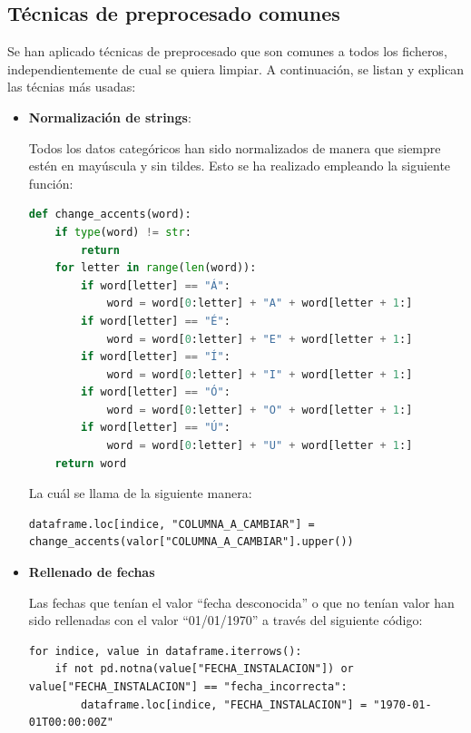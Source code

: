 \documentclass[]{article}
\begin{document}
\subsection{Técnicas de preprocesado comunes}
\label{subsec:preprocesadocomun}
Se han aplicado técnicas de preprocesado que son comunes a todos los ficheros, independientemente de cual se quiera limpiar. A continuación, se listan y explican las técnias más usadas:

\begin{itemize}
    \item \textbf{Normalización de strings}:

    Todos los datos categóricos han sido normalizados de manera que siempre estén en mayúscula y sin tildes. Esto se ha realizado empleando la siguiente función:

    \begin{lstlisting}[language=Python,caption=Eliminación de tildes]
def change_accents(word):
    if type(word) != str:
        return
    for letter in range(len(word)):
        if word[letter] == "Á":
            word = word[0:letter] + "A" + word[letter + 1:]
        if word[letter] == "É":
            word = word[0:letter] + "E" + word[letter + 1:]
        if word[letter] == "Í":
            word = word[0:letter] + "I" + word[letter + 1:]
        if word[letter] == "Ó":
            word = word[0:letter] + "O" + word[letter + 1:]
        if word[letter] == "Ú":
            word = word[0:letter] + "U" + word[letter + 1:]
    return word
    \end{lstlisting}

    La cuál se llama de la siguiente manera:

    \begin{lstlisting}[caption=Capitalización de strings y eliminacion de tildes]
dataframe.loc[indice, "COLUMNA_A_CAMBIAR"] = change_accents(valor["COLUMNA_A_CAMBIAR"].upper())
    \end{lstlisting}

    \item \textbf{Rellenado de fechas}

    Las fechas que tenían el valor ``fecha desconocida'' o que no tenían valor han sido rellenadas con el valor ``01/01/1970'' a través del siguiente código:

    \begin{lstlisting}[caption=Imputacion de fechas incorrectas o faltantes]
for indice, value in dataframe.iterrows():
    if not pd.notna(value["FECHA_INSTALACION"]) or value["FECHA_INSTALACION"] == "fecha_incorrecta":
        dataframe.loc[indice, "FECHA_INSTALACION"] = "1970-01-01T00:00:00Z"
    \end{lstlisting}


\end{itemize}
\end{document}
